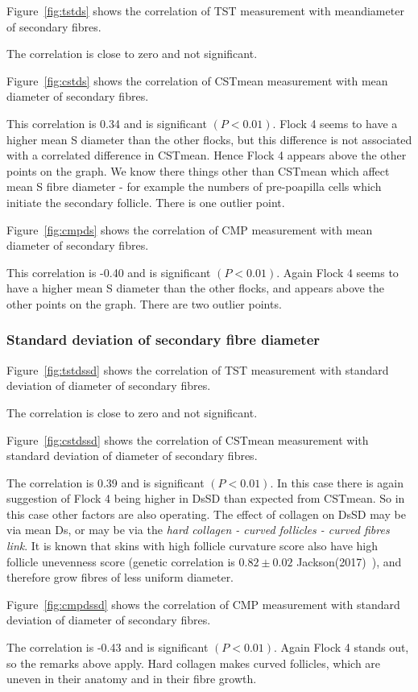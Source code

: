 \documentclass[titlepage]{article}  %
\begin{document}
Figure~\ref{fig:tstds} shows the correlation of TST measurement with meandiameter of secondary fibres.

The correlation is close to zero and not significant. 

Figure~\ref{fig:cstds} shows the correlation of CSTmean measurement with mean diameter of secondary fibres.

This correlation is 0.34 and is significant $(P<0.01)$. Flock 4 seems to have a higher mean S diameter than the other flocks, but this difference is not associated with a correlated difference in CSTmean. Hence Flock 4 appears above the other points on the graph. We know there things other than CSTmean which affect mean S fibre diameter - for example the numbers of pre-poapilla cells which initiate the secondary follicle.  There is one outlier point.

Figure~\ref{fig:cmpds} shows the correlation of CMP measurement with mean diameter of secondary fibres.

This correlation is -0.40 and is significant $(P<0.01)$. Again Flock 4 seems to have a higher mean S diameter than the other flocks, and appears above the other points on the graph. There are two outlier points.

\subsubsection{Standard deviation of secondary fibre diameter}
Figure~\ref{fig:tstdssd} shows the correlation of TST measurement with standard deviation of diameter of secondary fibres.

The correlation is close to zero and not significant.

Figure~\ref{fig:cstdssd} shows the correlation of CSTmean measurement with standard deviation of diameter of secondary fibres.

The correlation is 0.39 and is significant $(P<0.01)$. In this case there is again suggestion of Flock 4 being higher in DsSD than expected from CSTmean. So in this case other factors are also operating. The effect of collagen on DsSD may be via mean Ds, or may be via the {\em  hard collagen - curved follicles - curved fibres link}. It is known that skins with high follicle curvature score also have high follicle unevenness score (genetic correlation is $0.82\pm0.02$ Jackson(2017)~\cite{jack:17a}), and therefore grow fibres of less uniform diameter.

Figure~\ref{fig:cmpdssd} shows the correlation of CMP measurement with standard deviation of diameter of secondary fibres.

The correlation is -0.43 and is significant $(P<0.01)$.  Again Flock 4 stands out, so the remarks above apply. Hard collagen makes curved follicles, which are uneven in their anatomy and in their fibre growth. 
\end{document}
